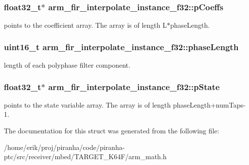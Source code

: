 \subsubsection[{\texorpdfstring{p\+Coeffs}{pCoeffs}}]{\setlength{\rightskip}{0pt plus 5cm}float32\+\_\+t$\ast$ arm\+\_\+fir\+\_\+interpolate\+\_\+instance\+\_\+f32\+::p\+Coeffs}\hypertarget{structarm__fir__interpolate__instance__f32_a86053b715980a93c9df630d6de5bb63c}{}\label{structarm__fir__interpolate__instance__f32_a86053b715980a93c9df630d6de5bb63c}
points to the coefficient array. The array is of length L$\ast$phase\+Length. 
\subsubsection[{\texorpdfstring{phase\+Length}{phaseLength}}]{\setlength{\rightskip}{0pt plus 5cm}uint16\+\_\+t arm\+\_\+fir\+\_\+interpolate\+\_\+instance\+\_\+f32\+::phase\+Length}\hypertarget{structarm__fir__interpolate__instance__f32_a389e669e13ec56292a70db8e92194b12}{}\label{structarm__fir__interpolate__instance__f32_a389e669e13ec56292a70db8e92194b12}
length of each polyphase filter component. 
\subsubsection[{\texorpdfstring{p\+State}{pState}}]{\setlength{\rightskip}{0pt plus 5cm}float32\+\_\+t$\ast$ arm\+\_\+fir\+\_\+interpolate\+\_\+instance\+\_\+f32\+::p\+State}\hypertarget{structarm__fir__interpolate__instance__f32_a42a8ba1bda85fa86d7b6c84d3da4c75b}{}\label{structarm__fir__interpolate__instance__f32_a42a8ba1bda85fa86d7b6c84d3da4c75b}
points to the state variable array. The array is of length phase\+Length+num\+Taps-\/1. 

The documentation for this struct was generated from the following file\+:\begin{DoxyCompactItemize}
\item 
/home/erik/proj/piranha/code/piranha-\/ptc/src/receiver/mbed/\+T\+A\+R\+G\+E\+T\+\_\+\+K64\+F/arm\+\_\+math.\+h\end{DoxyCompactItemize}
